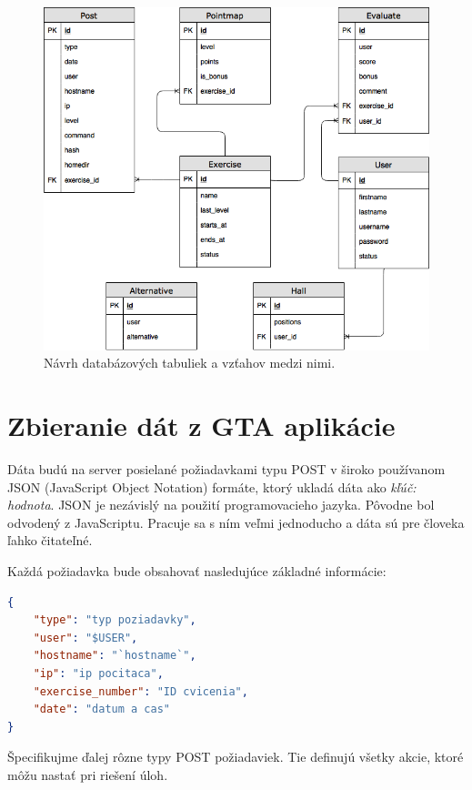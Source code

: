 \begin{figure}[h]
	\centerline{\includegraphics[width=1\textwidth]{images/tabulky.png}}
	\caption[Návrh databázových tabuliek]{Návrh databázových tabuliek a vzťahov medzi nimi.}
	\label{img:navrhdb}
\end{figure}
\clearpage

\section{Zbieranie dát z GTA aplikácie}
\label{sec:zbieraniedat}

Dáta budú na server posielané požiadavkami typu POST v široko používanom JSON
(JavaScript Object Notation) formáte, ktorý ukladá dáta ako \textit{kľúč: hodnota}.
JSON je nezávislý na použití programovacieho jazyka. Pôvodne bol odvodený
z JavaScriptu. Pracuje sa s ním veľmi jednoducho a dáta sú pre človeka ľahko
čitateľné.

Každá požiadavka bude obsahovať nasledujúce základné informácie:

\begin{lstlisting}[language=json,firstnumber=1]
{
    "type": "typ poziadavky",
    "user": "$USER",
    "hostname": "`hostname`",
    "ip": "ip pocitaca",
    "exercise_number": "ID cvicenia",
    "date": "datum a cas"
}
\end{lstlisting}

Špecifikujme ďalej rôzne typy POST požiadaviek. Tie definujú všetky akcie, ktoré
môžu nastať pri riešení úloh.

